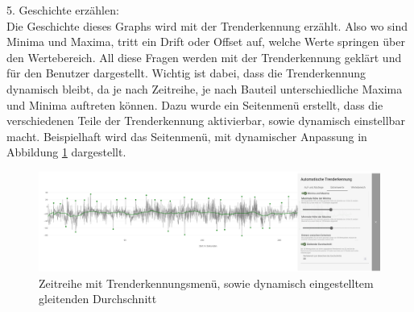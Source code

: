5. Geschichte erzählen:\\
Die Geschichte dieses Graphs wird mit der Trenderkennung erzählt. Also wo sind Minima und Maxima, tritt ein Drift oder Offset auf, welche Werte springen über den Wertebereich. All diese Fragen werden mit der Trenderkennung geklärt und für den Benutzer dargestellt. Wichtig ist dabei, dass die Trenderkennung dynamisch bleibt, da je nach Zeitreihe, je nach Bauteil unterschiedliche Maxima und Minima auftreten können. Dazu wurde ein Seitenmenü erstellt, dass die verschiedenen Teile der Trenderkennung aktivierbar, sowie dynamisch einstellbar macht. Beispielhaft wird das Seitenmenü, mit dynamischer Anpassung in Abbildung  \ref{fig:zeitreihe_mit_trenderkennung} dargestellt.
\begin{figure}[h!]
    \centering
    \includegraphics[width=\linewidth]{gfx/zeitreihe_mit_trenderkennung.png}
    \caption{Zeitreihe mit Trenderkennungsmenü, sowie dynamisch eingestelltem gleitenden Durchschnitt}
    \label{fig:zeitreihe_mit_trenderkennung}
\end{figure}
